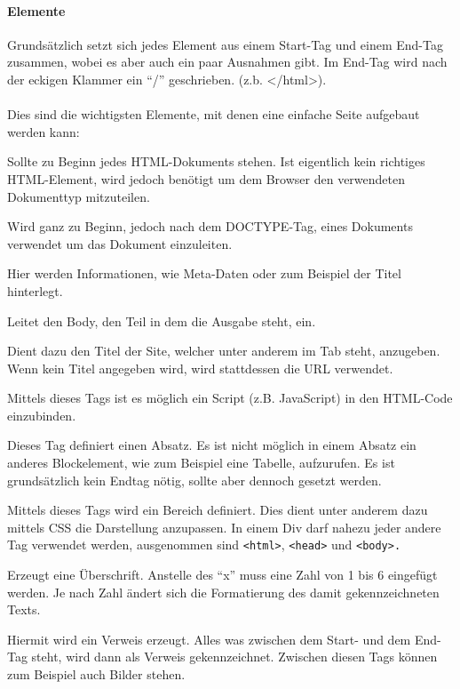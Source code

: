 \paragraph{Elemente}
Grundsätzlich setzt sich jedes Element aus einem Start-Tag und einem End-Tag zusammen, wobei es aber auch ein paar Ausnahmen gibt.  Im End-Tag wird nach der eckigen Klammer ein \enquote{/} geschrieben. (z.b. </html>).\\\\
Dies sind die wichtigsten Elemente, mit denen eine einfache Seite aufgebaut werden kann:
\begin{description} [style=nextline]
	\item[\texttt{<!DOCTYPE html>}] Sollte zu Beginn jedes HTML-Dokuments stehen. Ist eigentlich kein richtiges HTML-Element, wird jedoch benötigt um dem Browser den verwendeten Dokumenttyp mitzuteilen.
	\item[\texttt{<html>}] Wird ganz zu Beginn, jedoch nach dem DOCTYPE-Tag,  eines Dokuments verwendet um das Dokument einzuleiten.
	\item[\texttt{<head>}] Hier werden Informationen, wie Meta-Daten oder zum Beispiel der Titel hinterlegt.
	\item[\texttt{<body>}] Leitet den Body, den Teil in dem die Ausgabe steht, ein.
	\item[\texttt{<title>}] Dient dazu den Titel der Site, welcher unter anderem im Tab steht, anzugeben. Wenn kein Titel angegeben wird, wird stattdessen die URL verwendet.
	\item[\texttt{<script>}] Mittels dieses Tags ist es möglich ein Script (z.B. JavaScript) in den HTML-Code einzubinden.
	\item[\texttt{<p>}] Dieses Tag definiert einen Absatz. Es ist nicht möglich in einem Absatz ein anderes Blockelement, wie zum Beispiel eine Tabelle, aufzurufen. Es ist grundsätzlich kein Endtag nötig, sollte aber dennoch gesetzt werden.
	\item[\texttt{<div>}] Mittels dieses Tags wird ein Bereich definiert. Dies dient unter anderem dazu mittels CSS die Darstellung anzupassen. In einem Div darf nahezu jeder andere Tag verwendet werden, ausgenommen sind \texttt{<html>}, \texttt{<head>} und \texttt{<body>.}
	\item[\texttt{<hx>}] Erzeugt eine Überschrift. Anstelle des \enquote{x} muss eine Zahl von 1 bis 6 eingefügt werden. Je nach Zahl ändert sich die Formatierung des damit gekennzeichneten Texts.
	\item[\texttt{<a>}] Hiermit wird ein Verweis erzeugt. Alles was zwischen dem Start- und dem End-Tag steht, wird dann als Verweis gekennzeichnet. Zwischen diesen Tags können zum Beispiel auch Bilder stehen.

\end{description}
